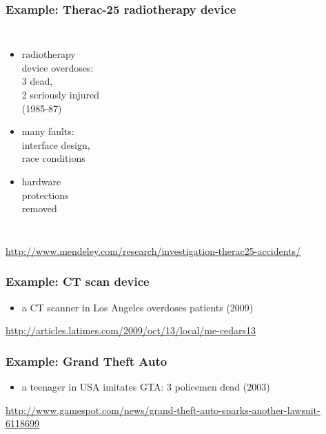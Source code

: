 \documentclass[dvipsnames]{beamer}
\theoremstyle{plain}
\begin{document}
\begin{frame}
  \frametitle{Example: Therac-25 radiotherapy device}

  \begin{columns}

    \begin{itemize}
      \item radiotherapy\\
        device overdoses:\\
        3 dead,\\
        2 seriously injured\\
        (1985-87)

      \item many faults:\\
        interface design,\\
        race conditions
      \item hardware\\
        protections\\
        removed
    \end{itemize}
  \end{columns}

  \medskip
  \tiny{\url{http://www.mendeley.com/research/investigation-therac25-accidents/}}\\
\end{frame}

\begin{frame}
  \frametitle{Example: CT scan device}

  \begin{center}
  \end{center}

  \begin{itemize}
    \item a CT scanner in Los Angeles overdoses patients (2009)
  \end{itemize}

  \medskip
  \tiny{\url{http://articles.latimes.com/2009/oct/13/local/me-cedars13}}\\
\end{frame}

\begin{frame}
  \frametitle{Example: Grand Theft Auto}

  \begin{center}
  \end{center}

  \begin{itemize}
    \item a teenager in USA imitates GTA: 3 policemen dead (2003)
  \end{itemize}

  \medskip
  \tiny{\url{http://www.gamespot.com/news/grand-theft-auto-sparks-another-lawsuit-6118699}}\\
\end{frame}
\end{document}
